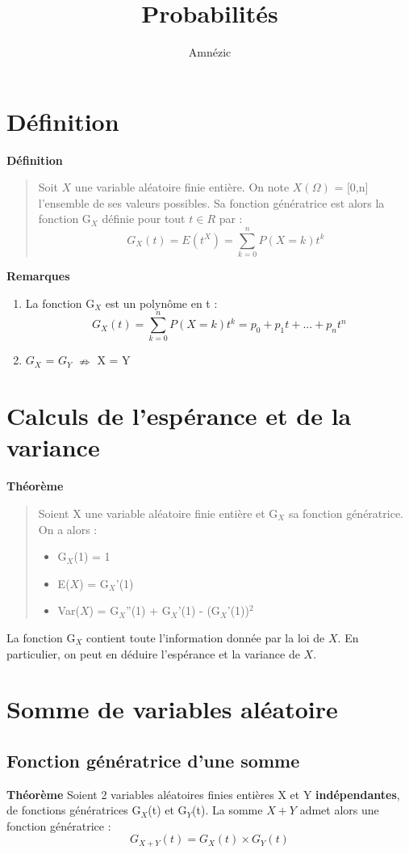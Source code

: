 \documentclass{article}
\author{Amnézic}
\date{}
\title{Probabilités}
\begin{document}
\maketitle
\newpage
\tableofcontents
\newpage

\section{Définition}
\textbf{Définition}
\begin{quote}
    Soit $X$ une variable aléatoire finie entière. On note $X(\Omega)$ = [0,n] l'ensemble de ses valeurs possibles. Sa fonction génératrice est alors la fonction G$_{X}$ définie pour tout $t \in R$ par :
    \[ G_{X}(t) = E(t^{X}) = \sum_{k=0}^{n} P(X=k)t^{k} \]
\end{quote}

\noindent \textbf{Remarques}
\begin{enumerate}
    \item La fonction G$_{X}$ est un polynôme en t : \[ G_{X}(t) = \sum_{k=0}^{n} P(X=k)t^{k} = p_{0} + p_{1}t + ... + p_{n}t^{n} \]
    \item $G_{X}$ = $G_{Y}$ $\nRightarrow$ X = Y
\end{enumerate}

\section{Calculs de l'espérance et de la variance}
\textbf{Théorème}
\begin{quote}
    Soient X une variable aléatoire finie entière et G$_{X}$ sa fonction génératrice. On a alors :
    \begin{itemize}
        \item G$_{X}$(1) = 1
        \item E($X$) = G$_{X}$'(1)
        \item Var($X$) = G$_{X}$''(1) + G$_{X}$'(1) - (G$_{X}$'(1))$^{2}$
    \end{itemize}
\end{quote}

La fonction G$_{X}$ contient toute l'information donnée par la loi de $X$. En particulier, on peut en déduire l'espérance et la variance de $X$.

\section{Somme de variables aléatoire}
\subsection{Fonction génératrice d'une somme}
\textbf{Théorème}
Soient 2 variables aléatoires finies entières X et Y \textbf{indépendantes}, de fonctions génératrices G$_{X}$(t) et G$_{Y}$(t). La somme $X + Y$ admet alors une fonction génératrice :
\[ G_{X+Y}(t) = G_{X}(t) \times G_{Y}(t) \]
\end{document}
